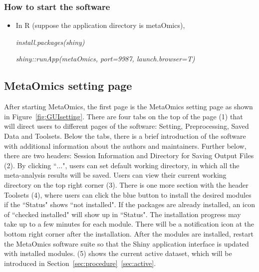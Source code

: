 \subsubsection{How to start the software}
\begin{itemize}
\item In R (suppose the application directory is metaOmics),

\textit{install.packages(\textquotesingle shiny\textquotesingle)}

\textit{shiny::runApp(\textquotesingle metaOmics\textquotesingle, port=9987, launch.browser=T)}
\end{itemize}

\subsection{MetaOmics setting page}
\label{sec:setting}
After starting MetaOmics, 
the first page is the MetaOmics setting page as shown in Figure~\ref{fig:GUIsetting}.  
There are four tabs on the top of the page {\color{red} (1)} that will direct users to different pages of the software: Setting, Preprocessing, Saved Data and Toolsets.
Below the tabs, there is a brief introduction of the software with additional information about the authors and maintainers.
Further below, there are two headers: Session Information and Directory for Saving Output Files {\color{red} (2)}.
By clicking ``$\ldots$",
users can set default working directory, in which all the meta-analysis results will be saved.
Users can view their current working directory on the top right corner {\color{red} (3)}.
There is one more section with the header Toolsets {\color{red} (4)},
where users can click the blue button to install the desired modules if the ``Status" shows ``not installed".
If the packages are already installed, an icon of ``checked installed" will show up in ``Status".
The installation progress may take up to a few minutes for each module.
There will be a notification icon at the bottom right corner after the installation. 
After the modules are installed, restart the MetaOmics software suite so that the Shiny application interface is updated with installed modules.
{\color{red} (5)} shows the current active dataset, which will be introduced in Section~\ref{sec:procedure}~\ref{sec:active}. 
 
